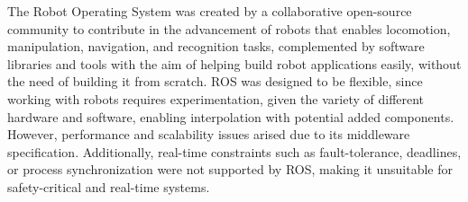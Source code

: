 

The Robot Operating System was created by a collaborative open-source community to contribute in the advancement of robots \cite{diluoffo2018robot} that enables locomotion, manipulation, navigation, and recognition tasks, complemented by software libraries and tools with the aim of helping build robot applications easily, without the need of building it from scratch. ROS was designed to be flexible, since working with robots requires experimentation, given the variety of different hardware and software, enabling interpolation with potential added components. However, performance and scalability issues arised due to its middleware specification. \cite{intro-ros} Additionally, real-time constraints such as fault-tolerance, deadlines, or process synchronization were not supported by ROS, making it unsuitable for safety-critical and real-time systems. \cite{kim2018security} 

